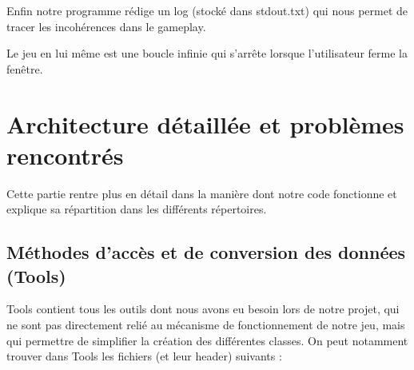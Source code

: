\documentclass[a4paper,twoside, openany,11pt]{book}
\begin{document}
Enfin notre programme rédige un log (stocké dans stdout.txt) qui nous permet de tracer les incohérences dans le gameplay. 

Le jeu en lui même est une boucle infinie qui s'arrête lorsque l'utilisateur ferme la fenêtre. 

\newpage

\section{Architecture détaillée et problèmes rencontrés}
Cette partie rentre plus en détail dans la manière dont notre code fonctionne et explique sa répartition dans les différents répertoires.


\subsection{Méthodes d'accès et de conversion des données (Tools)}
Tools contient tous les outils dont nous avons eu besoin lors de notre projet, qui ne sont pas directement relié au mécanisme de fonctionnement de notre jeu, mais qui permettre de simplifier la création des différentes classes. On peut notamment trouver dans Tools les fichiers (et leur header) suivants :
\end{document}
